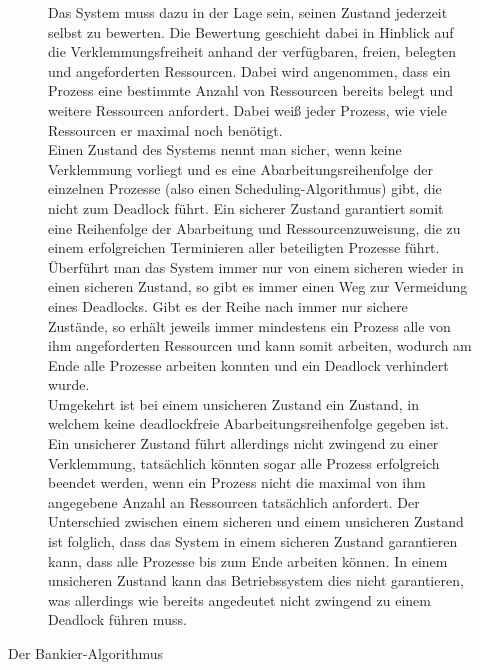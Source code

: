 \begin{description}
\begin{description}
								Das System muss dazu in der Lage sein, seinen Zustand jederzeit selbst zu bewerten. Die Bewertung geschieht dabei in Hinblick auf die Verklemmungsfreiheit anhand der verfügbaren, freien, belegten und angeforderten Ressourcen. Dabei wird angenommen, dass ein Prozess eine bestimmte Anzahl von Ressourcen bereits belegt und weitere Ressourcen anfordert. Dabei weiß jeder Prozess, wie viele Ressourcen er maximal noch benötigt.\\
								Einen Zustand des Systems nennt man sicher, wenn keine Verklemmung vorliegt und es eine Abarbeitungsreihenfolge der einzelnen Prozesse (also einen Scheduling-Algorithmus) gibt, die nicht zum Deadlock führt. Ein sicherer Zustand garantiert somit eine Reihenfolge der Abarbeitung und Ressourcenzuweisung, die zu einem erfolgreichen Terminieren aller beteiligten Prozesse führt. Überführt man das System immer nur von einem sicheren wieder in einen sicheren Zustand, so gibt es immer einen Weg zur Vermeidung eines Deadlocks. Gibt es der Reihe nach immer nur sichere Zustände, so erhält jeweils immer mindestens ein Prozess alle von ihm angeforderten Ressourcen und kann somit arbeiten, wodurch am Ende alle Prozesse arbeiten konnten und ein Deadlock verhindert wurde.\\
								Umgekehrt ist bei einem unsicheren Zustand ein Zustand, in welchem keine deadlockfreie Abarbeitungsreihenfolge gegeben ist. Ein unsicherer Zustand führt allerdings nicht zwingend zu einer Verklemmung, tatsächlich könnten sogar alle Prozess erfolgreich beendet werden, wenn ein Prozess nicht die maximal von ihm angegebene Anzahl an Ressourcen tatsächlich anfordert. Der Unterschied zwischen einem sicheren und einem unsicheren Zustand ist folglich, dass das System in einem sicheren Zustand garantieren kann, dass alle Prozesse bis zum Ende arbeiten können. In einem unsicheren Zustand kann das Betriebssystem dies nicht garantieren, was allerdings wie bereits angedeutet nicht zwingend zu einem Deadlock führen muss. \cite{SichererUnsichererZustandBennewitz}
								
							\item[Der Bankier-Algorithmus]
							

\end{description}
\end{description}
